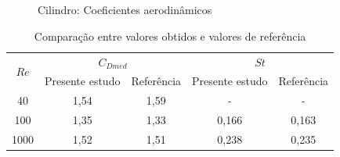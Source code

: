 \begin{figure}[!htbp]
	\caption{Cilindro: Coeficientes aerodinâmicos}
	\centering
	\\ 
	\\ 
	\label{fig:cilindro_coefAero}
\end{figure}

\begin{table}[h!]
	\centering
	\caption{Comparação entre valores obtidos e valores de referência}
	\begin{tabular}{ccccc}
		\toprule
		\multirow{2}{*}{$Re$} & \multicolumn{2}{c}{$C_{Dmed}$} & \multicolumn{2}{c}{$St$} \\ \cline{2-5}
		& Presente estudo & Referência & Presente estudo & Referência \\ \midrule \midrule
		40   & 1,54  & 1,59 & - & - \\ \midrule
		100  & 1,35 &  1,33 & 0,166 & 0,163 \\ \midrule
		1000 & 1,52 &  1,51 & 0,238 & 0,235 \\ \bottomrule
	\end{tabular}
	\label{tab:cilindro_CD_ST}
\end{table}


